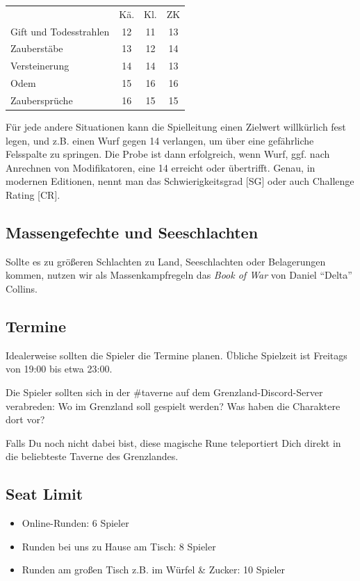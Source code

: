\documentclass[11pt]{wbzine}
\begin{document}
\begin{multicols}{2}
    \begin{tabularx}{\columnwidth}{Yccc}
            & Kä. & Kl. & ZK \\
	Gift und Todesstrahlen & 12 & 11 & 13 \\
	Zauberstäbe & 13 & 12 & 14 \\
	Versteinerung & 14 & 14 & 13 \\
	Odem & 15 & 16 & 16 \\
	Zaubersprüche & 16 & 15 & 15 \\ 
    \end{tabularx}

    Für jede andere Situationen kann die Spielleitung einen Zielwert
willkürlich fest legen, und z.B. einen Wurf gegen 14 verlangen, um über eine
gefährliche Felsspalte zu springen. Die Probe ist dann erfolgreich, wenn Wurf,
ggf. nach Anrechnen von Modifikatoren, eine 14 erreicht oder übertrifft.
Genau, in modernen Editionen, nennt man das Schwierigkeitsgrad [SG] oder auch
Challenge Rating [CR].
    

    \subsection{Massengefechte und Seeschlachten}

    Sollte es zu größeren Schlachten zu Land, Seeschlachten oder
    Belagerungen kommen, nutzen wir als Massenkampfregeln das
    \textit{Book of War} von Daniel ``Delta'' Collins.

\subsection{Termine}

    Idealerweise sollten die Spieler die Termine planen.
    Übliche Spielzeit ist Freitags von 19:00 bis etwa 23:00.

Die Spieler sollten sich in der \#taverne auf dem Grenzland-Discord-Server verabreden:
Wo im Grenzland soll gespielt werden? Was haben die Charaktere dort vor?

Falls Du noch nicht dabei bist, diese magische Rune teleportiert
Dich direkt in die beliebteste Taverne des Grenzlandes.


\subsection{Seat Limit}

\begin{itemize}
    \item Online-Runden: 6 Spieler
    \item Runden bei uns zu Hause am Tisch: 8 Spieler
    \item Runden am großen Tisch z.B. im Würfel \& Zucker: 10 Spieler
\end{itemize}


\end{multicols}
\end{document}
